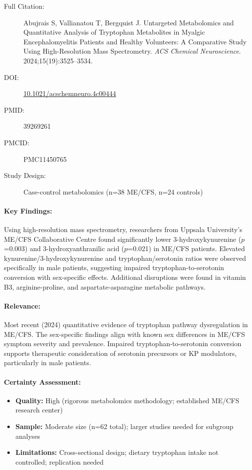 \begin{description}
    \item[Full Citation:] Abujrais S, Vallianatou T, Bergquist J. Untargeted Metabolomics and Quantitative Analysis of Tryptophan Metabolites in Myalgic Encephalomyelitis Patients and Healthy Volunteers: A Comparative Study Using High-Resolution Mass Spectrometry. \textit{ACS Chemical Neuroscience}. 2024;15(19):3525--3534.
    \item[DOI:] \href{https://doi.org/10.1021/acschemneuro.4c00444}{10.1021/acschemneuro.4c00444}
    \item[PMID:] 39269261
    \item[PMCID:] PMC11450765
    \item[Study Design:] Case-control metabolomics (n=38 ME/CFS, n=24 controls)
\end{description}

\paragraph{Key Findings:}
Using high-resolution mass spectrometry, researchers from Uppsala University's ME/CFS Collaborative Centre found significantly lower 3-hydroxykynurenine ($p$=0.003) and 3-hydroxyanthranilic acid ($p$=0.021) in ME/CFS patients. Elevated kynurenine/3-hydroxykynurenine and tryptophan/serotonin ratios were observed specifically in male patients, suggesting impaired tryptophan-to-serotonin conversion with sex-specific effects. Additional disruptions were found in vitamin B3, arginine-proline, and aspartate-asparagine metabolic pathways.

\paragraph{Relevance:}
Most recent (2024) quantitative evidence of tryptophan pathway dysregulation in ME/CFS. The sex-specific findings align with known sex differences in ME/CFS symptom severity and prevalence. Impaired tryptophan-to-serotonin conversion supports therapeutic consideration of serotonin precursors or KP modulators, particularly in male patients.

\paragraph{Certainty Assessment:}
\begin{itemize}
    \item \textbf{Quality:} High (rigorous metabolomics methodology; established ME/CFS research center)
    \item \textbf{Sample:} Moderate size (n=62 total); larger studies needed for subgroup analyses
    \item \textbf{Limitations:} Cross-sectional design; dietary tryptophan intake not controlled; replication needed
\end{itemize}

